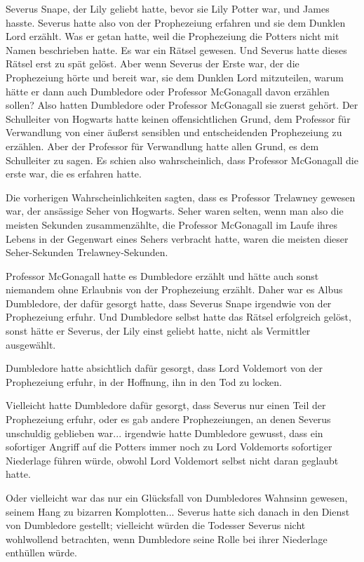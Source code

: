Severus Snape, der Lily geliebt hatte, bevor sie Lily Potter war, und James
hasste. Severus hatte also von der Prophezeiung erfahren und sie dem Dunklen
Lord erzählt. Was er getan hatte, weil die Prophezeiung die Potters nicht mit
Namen beschrieben hatte. Es war ein Rätsel gewesen. Und Severus hatte dieses
Rätsel erst zu spät gelöst. Aber wenn Severus der Erste war, der die
Prophezeiung hörte und bereit war, sie dem Dunklen Lord mitzuteilen, warum hätte
er dann auch Dumbledore oder Professor McGonagall davon erzählen sollen? Also
hatten Dumbledore oder Professor McGonagall sie zuerst gehört. Der Schulleiter
von Hogwarts hatte keinen offensichtlichen Grund, dem Professor für Verwandlung
von einer äußerst sensiblen und entscheidenden Prophezeiung zu erzählen. Aber
der Professor für Verwandlung hatte allen Grund, es dem Schulleiter zu sagen. Es
schien also wahrscheinlich, dass Professor McGonagall die erste war, die es
erfahren hatte.

Die vorherigen Wahrscheinlichkeiten sagten, dass es Professor Trelawney gewesen
war, der ansässige Seher von Hogwarts. Seher waren selten, wenn man also die
meisten Sekunden zusammenzählte, die Professor McGonagall im Laufe ihres Lebens
in der Gegenwart eines Sehers verbracht hatte, waren die meisten dieser
Seher-Sekunden Trelawney-Sekunden.

Professor McGonagall hatte es Dumbledore erzählt und hätte auch sonst niemandem
ohne Erlaubnis von der Prophezeiung erzählt. Daher war es Albus Dumbledore, der
dafür gesorgt hatte, dass Severus Snape irgendwie von der Prophezeiung erfuhr.
Und Dumbledore selbst hatte das Rätsel erfolgreich gelöst, sonst hätte er
Severus, der Lily einst geliebt hatte, nicht als Vermittler ausgewählt.

Dumbledore hatte absichtlich dafür gesorgt, dass Lord Voldemort von der
Prophezeiung erfuhr, in der Hoffnung, ihn in den Tod zu locken.

Vielleicht hatte Dumbledore dafür gesorgt, dass Severus nur einen Teil der
Prophezeiung erfuhr, oder es gab andere Prophezeiungen, an denen Severus
unschuldig geblieben war... irgendwie hatte Dumbledore gewusst, dass ein
sofortiger Angriff auf die Potters immer noch zu Lord Voldemorts sofortiger
Niederlage führen würde, obwohl Lord Voldemort selbst nicht daran geglaubt
hatte.

Oder vielleicht war das nur ein Glücksfall von Dumbledores Wahnsinn gewesen,
seinem Hang zu bizarren Komplotten... Severus hatte sich danach in den Dienst
von Dumbledore gestellt; vielleicht würden die Todesser Severus nicht
wohlwollend betrachten, wenn Dumbledore seine Rolle bei ihrer Niederlage
enthüllen würde.

